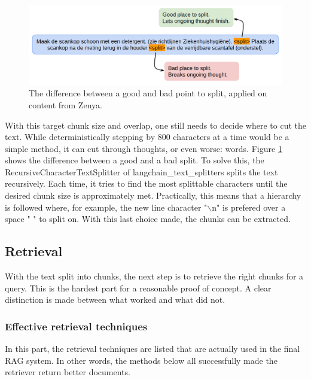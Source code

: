 \begin{figure}[h]
    \captionsetup{justification=centering}
    \centerline{\includegraphics[width=1\linewidth]{fig/good_split_bad_split.png}}
    \caption{The difference between a good and bad point to split, applied on content from Zenya.}
    \label{fig:good_split_bad_split}
\end{figure}

With this target chunk size and overlap, one still needs to decide where to cut the text. While deterministically stepping by 800 characters at a time would be a simple method, it can cut through thoughts, or even worse: words. Figure \ref{fig:good_split_bad_split} shows the difference between a good and a bad split. To solve this, the RecursiveCharacterTextSplitter of langchain\_text\_splitters splits the text recursively. Each time, it tries to find the most splittable characters until the desired chunk size is approximately met. Practically, this means that a hierarchy is followed where, for example, the new line character "$\backslash$n" is prefered over a space " " to split on. With this last choice made, the chunks can be extracted.

\subsection{Retrieval}
With the text split into chunks, the next step is to retrieve the right chunks for a query. This is the hardest part for a reasonable proof of concept. A clear distinction is made between what worked and what did not.

\subsubsection{Effective retrieval techniques}
In this part, the retrieval techniques are listed that are actually used in the final RAG system. In other words, the methods below all successfully made the retriever return better documents.

